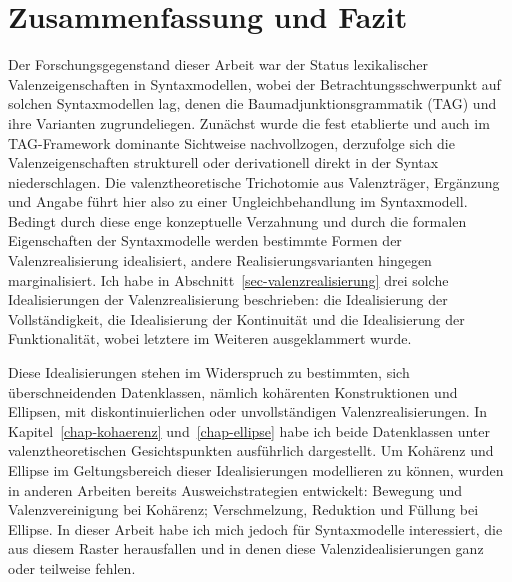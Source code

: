 \chapter{Zusammenfassung und Fazit} 

Der Forschungsgegenstand dieser Arbeit war der Status lexikalischer Valenzeigenschaften in Syntaxmodellen, wobei der Betrachtungsschwerpunkt auf solchen Syntaxmodellen lag, denen die Baumadjunktionsgrammatik (TAG) und ihre Varianten zugrundeliegen. Zunächst wurde die fest etablierte und auch im TAG-Framework dominante Sichtweise nachvollzogen, derzufolge sich die Valenzeigenschaften strukturell oder derivationell direkt in der Syntax niederschlagen. Die valenztheoretische Trichotomie aus Valenzträger, Ergänzung und Angabe führt hier also zu einer Ungleichbehandlung im Syntaxmodell. Bedingt durch diese enge konzeptuelle Verzahnung und durch die formalen Eigenschaften der Syntaxmodelle werden bestimmte Formen der Valenzrealisierung idealisiert, andere Realisierungsvarianten hingegen marginalisiert. Ich habe in Abschnitt~\ref{sec-valenzrealisierung} drei solche Idealisierungen der Valenzrealisierung beschrieben: die Idealisierung der Vollständigkeit, die Idealisierung der Kontinuität und die Idealisierung der Funktionalität, wobei letztere im Weiteren ausgeklammert wurde.

Diese Idealisierungen stehen im Widerspruch zu bestimmten, sich überschneidenden Datenklassen, nämlich kohärenten Konstruktionen und Ellipsen, mit diskontinuierlichen oder unvollständigen Valenzrealisierungen. In Kapitel~\ref{chap-kohaerenz} und~\ref{chap-ellipse} habe ich beide Datenklassen unter valenztheoretischen Gesichtspunkten ausführlich dargestellt. Um Kohärenz und Ellipse im Geltungsbereich dieser Idealisierungen modellieren zu können, wurden in anderen Arbeiten bereits Ausweichstrategien entwickelt: Bewegung und Valenzvereinigung bei Kohärenz; Verschmelzung, Reduktion und Füllung bei Ellipse. In dieser Arbeit habe ich mich jedoch für Syntaxmodelle interessiert, die aus diesem Raster herausfallen und in denen diese Valenzidealisierungen ganz oder teilweise fehlen.

